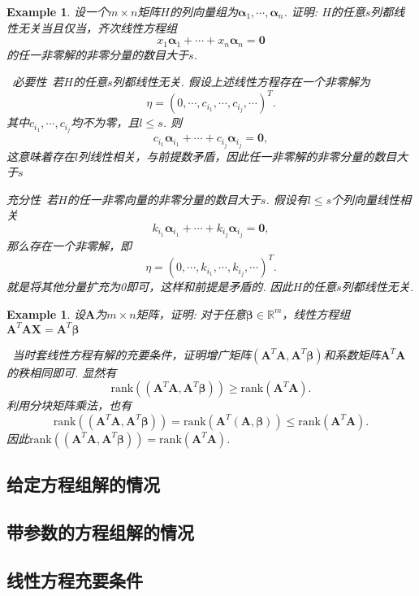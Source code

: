 \documentclass{article}
\newtheorem{example}[theorem]{Example}
\newcommand{\hints}{{\color{blue} \text{hints}}}
\newcommand{\mbf}[1]{\bm{#1}}
\newcommand{\rank}[1]{\text{rank}\left(#1\right)} %
\begin{document}
\begin{example}
\rm 设一个$m \times n$矩阵$H$的列向量组为$\mbf{\alpha}_1,\cdots,\mbf{\alpha}_n$. 证明: $H$的任意$s$列都线性无关当且仅当，齐次线性方程组
$$
x_1 \mbf{\alpha}_1 + \cdots + x_n \mbf{\alpha}_n = \mbf{0}
$$
的任一非零解的非零分量的数目大于$s$. 

\hints\ \emph{必要性}\ 若$H$的任意$s$列都线性无关. 假设上述线性方程存在一个非零解为
$$
\eta = (0,\cdots,c_{i_1},\cdots,c_{i_j},\cdots)^{T}. 
$$
其中$c_{i_1},\cdots,c_{i_j}$均不为零，且$ l \leq s$. 则
$$
c_{i_1}\mbf{\alpha}_{i_1}+\cdots+c_{i_j}\mbf{\alpha}_{i_j} = \mbf{0},
$$
这意味着存在$l$列线性相关，与前提数矛盾，因此任一非零解的非零分量的数目大于$s$

\emph{充分性}\ 若$H$的任一非零向量的非零分量的数目大于$s$. 假设有$l\leq s$个列向量线性相关
$$
k_{i_1}\mbf{\alpha}_{i_1}+\cdots+k_{i_j}\mbf{\alpha}_{i_j} = \mbf{0},
$$
那么存在一个非零解，即
$$
\eta = (0,\cdots,k_{i_1},\cdots,k_{i_j},\cdots)^{T}. 
$$
就是将其他分量扩充为0即可，这样和前提是矛盾的. 因此$H$的任意$s$列都线性无关. 
\end{example}

\begin{example}
\rm 设$\mbf{A}$为$m \times n$矩阵，证明: 对于任意$\mbf{\beta} \in \mathbb{R}^m$，线性方程组$\mbf{A}^T\mbf{A}\mbf{X} = \mbf{A}^T\mbf{\beta}$

\hints\ 当时套线性方程有解的充要条件，证明增广矩阵$(\mbf{A}^T\mbf{A},\mbf{A}^T\mbf{\beta})$和系数矩阵$\mbf{A}^T\mbf{A}$的秩相同即可. 显然有
$$
\rank{(\mbf{A}^T\mbf{A},\mbf{A}^T\mbf{\beta})} \geq \rank{\mbf{A}^T\mbf{A}}. 
$$
利用分块矩阵乘法，也有
$$
\rank{(\mbf{A}^T\mbf{A},\mbf{A}^T\mbf{\beta})} = \rank{\mbf{A}^T(\mbf{A},\mbf{\beta})} \leq \rank{\mbf{A}^T\mbf{A}}.
$$
因此$\rank{(\mbf{A}^T\mbf{A},\mbf{A}^T\mbf{\beta})} = \rank{\mbf{A}^T\mbf{A}}$. 
\end{example}

\subsection{给定方程组解的情况}


\subsection{带参数的方程组解的情况}


\subsection{线性方程充要条件}
\end{document}
